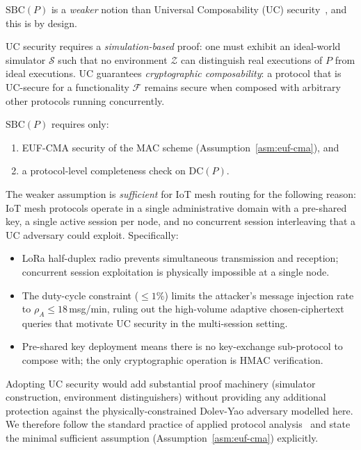 \begin{remark}
\label{rem:sbc-vs-uc}
$\mathrm{SBC}(P)$ is a \emph{weaker} notion than Universal
Composability (UC) security~\cite{canetti2001universally}, and this
is by design.

UC security requires a \emph{simulation-based} proof: one must exhibit
an ideal-world simulator $\mathcal{S}$ such that no environment
$\mathcal{Z}$ can distinguish real executions of $P$ from ideal
executions.  UC guarantees \emph{cryptographic composability}: a
protocol that is UC-secure for a functionality $\mathcal{F}$ remains
secure when composed with arbitrary other protocols running
concurrently.

$\mathrm{SBC}(P)$ requires only:
\begin{enumerate}[label=(\roman*)]
  \item EUF-CMA security of the MAC scheme (Assumption~\ref{asm:euf-cma}), and
  \item a protocol-level completeness check on $\mathrm{DC}(P)$.
\end{enumerate}

The weaker assumption is \emph{sufficient} for IoT mesh routing for the
following reason: IoT mesh protocols operate in a single administrative
domain with a pre-shared key, a single active session per node, and no
concurrent session interleaving that a UC adversary could exploit.
Specifically:
\begin{itemize}
  \item LoRa half-duplex radio prevents simultaneous transmission and
        reception; concurrent session exploitation is physically
        impossible at a single node.
  \item The duty-cycle constraint ($\leq 1\%$) limits the attacker's
        message injection rate to $\rho_A \leq 18$\,msg/min, ruling out
        the high-volume adaptive chosen-ciphertext queries that motivate
        UC security in the multi-session setting.
  \item Pre-shared key deployment means there is no key-exchange
        sub-protocol to compose with; the only cryptographic operation
        is HMAC verification.
\end{itemize}

Adopting UC security would add substantial proof machinery (simulator
construction, environment distinguishers) without providing any
additional protection against the physically-constrained Dolev-Yao
adversary modelled here.  We therefore follow the standard practice of
applied protocol analysis~\cite{cremers2019comprehensive} and state the
minimal sufficient assumption (Assumption~\ref{asm:euf-cma}) explicitly.
\end{remark}


